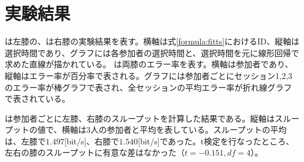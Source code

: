 \section{実験結果}
は左膝の、は右膝の実験結果を表す。横軸は式\ref{formula:fitts}におけるID、縦軸は選択時間であり、グラフには各参加者の選択時間と、選択時間を元に線形回帰で求めた直線が描かれている。
は両膝のエラー率を表す。横軸は参加者であり、縦軸はエラー率が百分率で表される。グラフには参加者ごとにセッション1,2,3のエラー率が棒グラフで表され、全セッションの平均エラー率が折れ線グラフで表されている。

は参加者ごとに左膝、右膝のスループットを計算した結果である。縦軸はスループットの値で、横軸は3人の参加者と平均を表している。スループットの平均は、左膝で$1.497$[bit/s]、右膝で$1.540$[bit/s]であった。t検定を行なったところ、左右の膝のスループットに有意な差はなかった（$t=-0.151, df=4$）。

